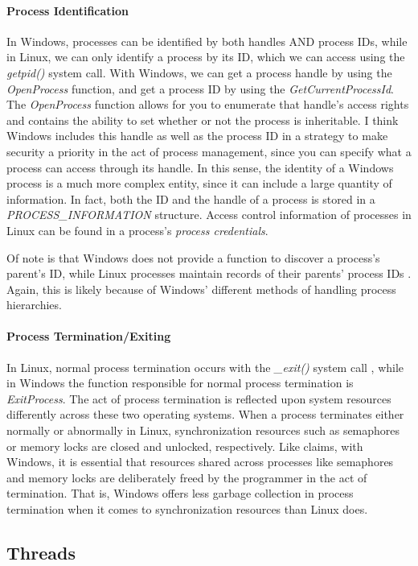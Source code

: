 \documentclass[letterpaper,10pt,titlepage]{article}
\begin{document}
\paragraph{Process Identification} In Windows, processes can be identified by both handles AND process IDs, while in Linux, we can only identify a process by its ID, which we can access using the \emph{getpid()} system call. With Windows, we can get a process handle by using the \emph{OpenProcess} function, and get a process ID by using the \emph{GetCurrentProcessId}. The \emph{OpenProcess} function allows for you to enumerate that handle's access rights and contains the ability to set whether or not the process is inheritable. I think Windows includes this handle as well as the process ID in a strategy to make security a priority in the act of process management, since you can specify what a process can access through its handle. In this sense, the identity of a Windows process is a much more complex entity, since it can include a large quantity of information. In fact, both the ID and the handle of a process is stored in a \emph{PROCESS\_INFORMATION} structure. Access control information of processes in Linux can be found in a process's \emph{process credentials}. 
\par Of note is that Windows does not provide a function to discover a process's parent's ID, while Linux processes maintain records of their parents' process IDs \cite{ker10}. Again, this is likely because of Windows' different methods of handling process hierarchies.  
\paragraph{Process Termination/Exiting}
In Linux, normal process termination occurs with the \emph{\_exit()} system call \cite{ker10}, while in Windows the function responsible for normal process termination is \emph{ExitProcess}.  The act of process termination is reflected upon system resources differently across these two operating systems. When a process terminates either normally or abnormally in Linux, synchronization resources such as semaphores or memory locks are closed and unlocked, respectively. Like \cite{har04} claims, with Windows, it is essential that resources shared across processes like semaphores and memory locks are deliberately freed by the programmer in the act of termination. That is, Windows offers less garbage collection in process termination when it comes to synchronization resources than Linux does. 

\subsection{Threads}
\end{document}
